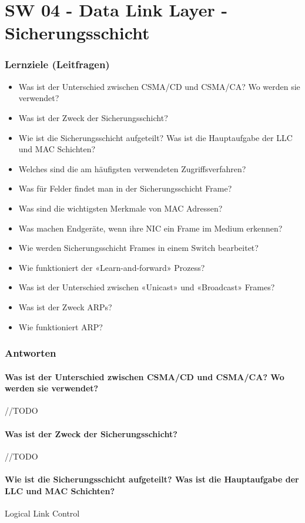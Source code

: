 \part{SW 04 - Data Link Layer - Sicherungsschicht}\label{part:sw04}
\section{Lernziele (Leitfragen)}
\begin{itemize}
    \item Was ist der Unterschied zwischen CSMA/CD und CSMA/CA? Wo werden sie verwendet?
    \item Was ist der Zweck der Sicherungsschicht?
    \item Wie ist die Sicherungsschicht aufgeteilt? Was ist die Hauptaufgabe der LLC und MAC Schichten?
    \item Welches sind die am häufigsten verwendeten Zugriffsverfahren?
    \item Was für Felder findet man in der Sicherungsschicht Frame?
    \item Was sind die wichtigsten Merkmale von MAC Adressen?
    \item Was machen Endgeräte, wenn ihre NIC ein Frame im Medium erkennen?
    \item Wie werden Sicherungsschicht Frames in einem Switch bearbeitet?
    \item Wie funktioniert der «Learn-and-forward» Prozess?
    \item Was ist der Unterschied zwischen «Unicast» und «Broadcast» Frames?
    \item Was ist der Zweck ARPs?
    \item Wie funktioniert ARP?
\end{itemize}

\section{Antworten}
\subsection*{Was ist der Unterschied zwischen CSMA/CD und CSMA/CA? Wo werden sie verwendet?}
//TODO
\subsection*{Was ist der Zweck der Sicherungsschicht?}
//TODO
\subsection*{Wie ist die Sicherungsschicht aufgeteilt? Was ist die Hauptaufgabe der LLC und MAC Schichten?}
Logical Link Control
